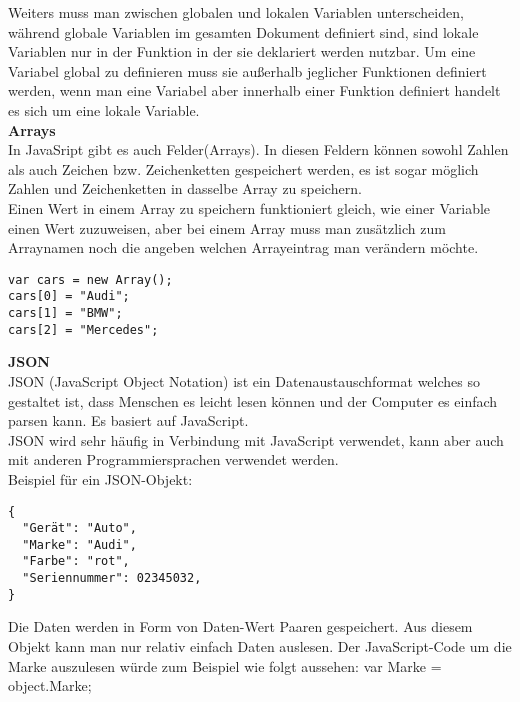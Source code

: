 Weiters muss man zwischen globalen und lokalen Variablen unterscheiden, während globale Variablen im gesamten Dokument definiert sind, sind lokale Variablen nur in der Funktion in der sie deklariert werden nutzbar. Um eine Variabel global zu definieren muss sie außerhalb jeglicher Funktionen definiert werden, wenn man eine Variabel aber innerhalb einer Funktion definiert handelt es sich um eine lokale Variable.\\

\textbf{Arrays}\\
In JavaSript gibt es auch Felder(Arrays). In diesen Feldern können sowohl Zahlen als auch Zeichen bzw. Zeichenketten gespeichert werden, es ist sogar möglich Zahlen und Zeichenketten in dasselbe Array zu speichern.\\
Einen Wert in einem Array zu speichern funktioniert gleich, wie einer Variable einen Wert zuzuweisen, aber bei einem Array muss man zusätzlich zum Arraynamen noch die angeben welchen Arrayeintrag man verändern möchte.\\
\begin{lstlisting}
var cars = new Array();
cars[0] = "Audi";
cars[1] = "BMW";
cars[2] = "Mercedes";
\end{lstlisting}

\textbf{JSON}\\
JSON (JavaScript Object Notation) ist ein Datenaustauschformat welches so gestaltet ist, dass Menschen es leicht lesen können und der Computer es einfach parsen kann. Es basiert auf JavaScript.\\
JSON wird sehr häufig in Verbindung mit JavaScript verwendet, kann aber auch mit anderen Programmiersprachen verwendet werden.\\
Beispiel für ein JSON-Objekt:\\
\begin{lstlisting}
{
  "Gerät": "Auto",
  "Marke": "Audi",
  "Farbe": "rot",
  "Seriennummer": 02345032,
}
\end{lstlisting}

Die Daten werden in Form von Daten-Wert Paaren gespeichert. Aus diesem Objekt kann man nur relativ einfach Daten auslesen. Der JavaScript-Code um die Marke auszulesen würde zum Beispiel wie folgt aussehen:
var Marke = object.Marke;

